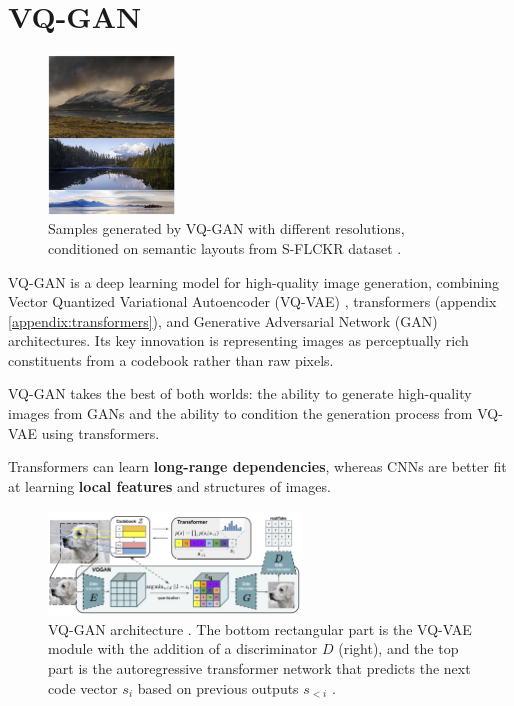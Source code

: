 \section{VQ-GAN}
\label{vqgan}

\begin{figure}
    \centering
    \includegraphics[width=0.3\textwidth]{images/vqgan_samples.png}
    \caption{Samples generated by VQ-GAN with different resolutions, conditioned on semantic layouts from S-FLCKR dataset \cite{vqgan}.}
\end{figure}


VQ-GAN \cite{vqgan} is a deep learning model for high-quality image generation, combining Vector Quantized Variational Autoencoder (VQ-VAE) \cite{vqvae}, transformers \cite{transformer} (appendix \ref{appendix:transformers}), and Generative Adversarial Network (GAN) \cite{gan} architectures. Its key innovation is representing images as perceptually rich constituents from a codebook rather than raw pixels.

VQ-GAN takes the best of both worlds: the ability to generate high-quality images from GANs and the ability to condition the generation process from VQ-VAE using transformers.

Transformers can learn \textbf{long-range dependencies}, whereas CNNs \cite{cnn} are better fit at learning \textbf{local features} and structures of images.

\begin{figure}
    \centering
    \includegraphics[width=0.6\textwidth]{images/vqgan_architecture.png}
    \caption{VQ-GAN architecture \cite{vqgan}. The bottom rectangular part is the VQ-VAE module with the addition of a discriminator $D$ (right), and the top part is the autoregressive transformer network that predicts the next code vector $s_i$ based on previous outputs $s_{<i}$ \cite{vqgan}.}
    \label{fig:vqgan_architecture}
\end{figure}

